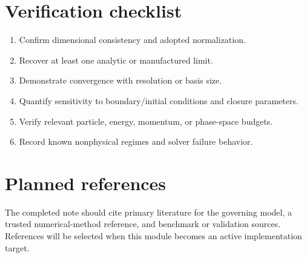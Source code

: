 \documentclass[11pt]{article}
\begin{document}
\section{Verification checklist}
\begin{enumerate}[leftmargin=1.6em]
\item Confirm dimensional consistency and adopted normalization.
\item Recover at least one analytic or manufactured limit.
\item Demonstrate convergence with resolution or basis size.
\item Quantify sensitivity to boundary/initial conditions and closure parameters.
\item Verify relevant particle, energy, momentum, or phase-space budgets.
\item Record known nonphysical regimes and solver failure behavior.
\end{enumerate}

\section{Planned references}
The completed note should cite primary literature for the governing model, a trusted numerical-method reference, and benchmark or validation sources. References will be selected when this module becomes an active implementation target.
\end{document}
